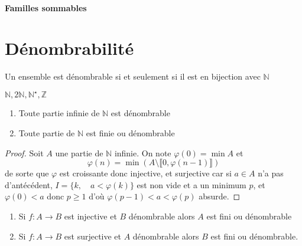 \ifsolo
    ~

    \vspace{1cm}

    \begin{center}
        \textbf{\LARGE Familles sommables} \\[1em]
    \end{center}
    \tableofcontents
\else
    \minitoc
\fi
\thispagestyle{empty}

\ifsolo \newpage \setcounter{page}{1} \fi

\section{Dénombrabilité}

\begin{dfn}
    Un ensemble est dénombrable si et seulement si il est en bijection avec $\mathbb N$
\end{dfn}

\begin{ex}
    $\mathbb N, 2\mathbb N, \mathbb N^\star, \mathbb Z$
\end{ex}

\begin{prop}
    \begin{enumerate}
        \item Toute partie infinie de $\mathbb N$ est dénombrable
        \item Toute partie de $\mathbb N$ est finie ou dénombrable
    \end{enumerate}
\end{prop}

\begin{proof}
    Soit $A$ une partie de $\mathbb N$ infinie. On note $\varphi(0)=\min A$ et \[
        \varphi(n)=\min (A\setminus \llbracket 0, \varphi(n-1)\rrbracket)
    \]
    de sorte que $\varphi$ est croissante donc injective, et surjective car si $a\in A$ n'a pas d'antécédent, $I=\{k, \quad a<\varphi(k)\}$ est non vide et a un minimum $p$, et $\varphi(0)<a$ donc $p\geq 1$ d'où $\varphi(p-1)< a<\varphi(p)$ absurde.
\end{proof}

\begin{prop}
    \begin{enumerate}
        \item Si $f:A\to B$ est injective et $B$ dénombrable alors $A$ est fini ou dénombrable
        \item Si $f:A\to B$ est surjective et $A$ dénombrable alors $B$ est fini ou dénombrable.
    \end{enumerate}
\end{prop}

